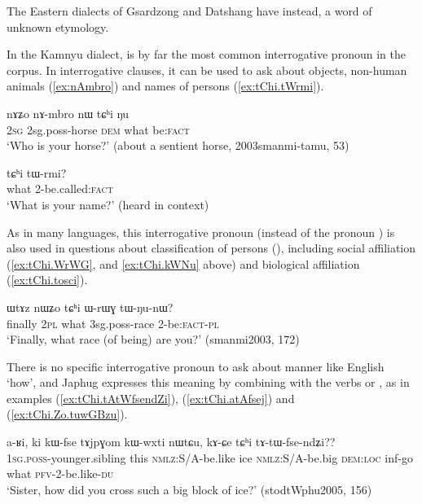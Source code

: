 The Eastern dialects of Gsardzong and Datshang have  instead, a word of unknown etymology.

In the Kamnyu dialect,  is by far the most common interrogative pronoun in the corpus. In interrogative clauses, it can be used to ask about objects, non-human animals (\ref{ex:nAmbro}) and names of persons (\ref{ex:tChi.tWrmi}).

\begin{exe}
\ex \label{ex:nAmbro}
\gll
nɤʑo nɤ-mbro nɯ tɕʰi ŋu \\
\textsc{2sg} 2sg.poss-horse \textsc{dem} what be:\textsc{fact} \\
\glt `Who is your horse?' (about a sentient horse, 2003smanmi-tamu, 53)
\end{exe}  

\begin{exe}
\ex \label{ex:tChi.tWrmi}
\gll tɕʰi tɯ-rmi? \\
what 2-be.called:\textsc{fact} \\
\glt `What is your name?' (heard in context)
\end{exe}  

As in many languages, this interrogative pronoun (instead of the pronoun ) is also used in questions about classification of persons (\citealt{idiatov07nonselective}), including social affiliation (\ref{ex:tChi.WrWG}, and \ref{ex:tChi.kWNu} above) and biological affiliation (\ref{ex:tChi.tosci}).

\begin{exe}
\ex \label{ex:tChi.WrWG}
\gll ɯtɤz nɯʑo tɕʰi ɯ-rɯɣ tɯ-ŋu-nɯ? \\
finally \textsc{2pl} what  3sg.poss-race  2-be:\textsc{fact}-\textsc{pl} \\
\glt `Finally, what race (of being) are you?' (smanmi2003, 172)
\end{exe}  

There is no specific interrogative pronoun to ask about manner like English `how', and Japhug expresses this meaning by combining  with the verbs  or , as in examples (\ref{ex:tChi.tAtWfsendZi}), (\ref{ex:tChi.atAfsej}) and (\ref{ex:tChi.Zo.tuwGBzu}).

\begin{exe}
\ex \label{ex:tChi.tAtWfsendZi}
\gll a-ʁi, ki kɯ-fse tɤjpɣom kɯ-wxti nɯtɕu, kɤ-ɕe tɕʰi tɤ-tɯ-fse-ndʑi?? \\
\textsc{1sg.poss}-younger.sibling this \textsc{nmlz}:S/A-be.like ice \textsc{nmlz}:S/A-be.big \textsc{dem:loc} inf-go what \textsc{pfv}-2-be.like-\textsc{du} \\
\glt `Sister, how did you cross such a big block of ice?' (stodtWphu2005, 156)
\end{exe}  

